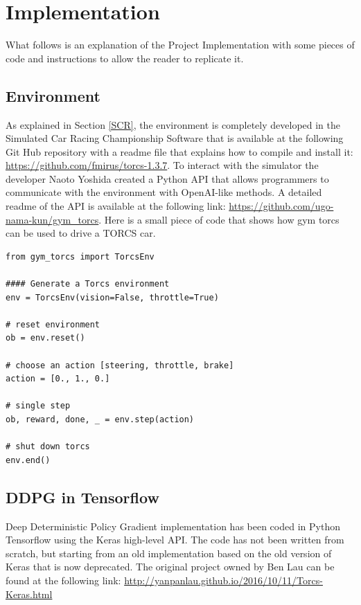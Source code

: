 \documentclass[Lau,oneside,noexaminfo]{sapthesis} %
\begin{document}
\chapter{Implementation}
What follows is an explanation of the Project Implementation with some pieces of code and instructions to allow the reader to replicate it.
\section{Environment}
As explained in Section \ref{SCR}, the environment is completely developed in the Simulated Car Racing Championship Software that is available at the following Git Hub repository with a readme file that explains how to compile and install it: \url{https://github.com/fmirus/torcs-1.3.7}.
To interact with the simulator the developer Naoto Yoshida created a Python API that allows programmers to communicate with the environment with OpenAI-like methods. A detailed readme of the API is available at the following link: \url{https://github.com/ugo-nama-kun/gym_torcs}.
Here is a small piece of code that shows how gym torcs can be used to drive a TORCS car.

\begin{lstlisting}
from gym_torcs import TorcsEnv

#### Generate a Torcs environment
env = TorcsEnv(vision=False, throttle=True)

# reset environment
ob = env.reset()

# choose an action [steering, throttle, brake]
action = [0., 1., 0.]

# single step
ob, reward, done, _ = env.step(action)

# shut down torcs
env.end()
\end{lstlisting}
\section{DDPG in Tensorflow}
Deep Deterministic Policy Gradient implementation has been coded in Python Tensorflow using the Keras high-level API. The code has not been written from scratch, but starting from an old implementation based on the old version of Keras that is now deprecated. The original project owned by Ben Lau can be found at the following link: \url{http://yanpanlau.github.io/2016/10/11/Torcs-Keras.html}
\end{document}
